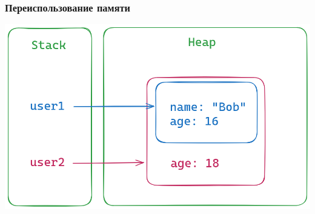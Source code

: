 \documentclass[10pt]{beamer}
\begin{document}
\begin{frame}
  \frametitle{Переиспользование памяти}
  \includegraphics[scale=0.33]{structure_sharing}
\end{frame}
\end{document}
